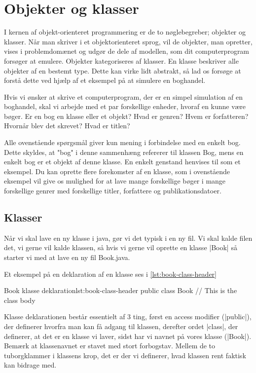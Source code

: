 \chapter{Objekter og klasser}

I kernen af objekt-orienteret programmering er de to nøglebegreber; objekter og klasser. Når man skriver i et objektorienteret sprog, vil de objekter, man opretter, vises i problemdomænet og udgør de dele af modellen, som dit computerprogram forsøger at emulere. Objekter kategoriseres af klasser. En klasse beskriver alle objekter af en bestemt type. Dette kan virke lidt abstrakt, så lad os forsøge at forstå dette ved hjælp af et eksempel på at simulere en boghandel.

\begin{example}
	Hvis vi ønsker at skrive et computerprogram, der er en simpel simulation af en boghandel, skal vi arbejde med et par forskellige enheder, hvoraf en kunne være bøger. Er en bog en klasse eller et objekt? Hvad er genren? Hvem er forfatteren? Hvornår blev det skrevet? Hvad er titlen?
	
	Alle ovenstående spørgsmål giver kun mening i forbindelse med en enkelt bog. Dette skyldes, at "bog" i denne sammenhæng refererer til klassen Bog, mens en enkelt bog er et objekt af denne klasse. En enkelt genstand henvises til som et eksempel. Du kan oprette flere forekomster af en klasse, som i ovenstående eksempel vil give os mulighed for at lave mange forskellige bøger i mange forskellige genrer med forskellige titler, forfattere og publikationsdatoer.
\end{example}

\section{Klasser}
Når vi skal lave en ny klasse i java, gør vi det typisk i en ny fil. Vi skal kalde filen det, vi gerne vil kalde klassen, så hvis vi gerne vil oprette en klasse \JavaInline|Book| så starter vi med at lave en ny fil Book.java.

Et eksempel på en deklaration af en klasse ses i \autoref{lst:book-class-header}

\begin{JavaCode}{Book klasse deklaration}{lst:book-class-header}
	public class Book {
		// This is the class body
	}
\end{JavaCode}

Klasse deklarationen består essentielt af 3 ting, først en access modifier (\JavaInline|public|), der definerer hvorfra man kan få adgang til klassen, derefter ordet \JavaInline|class|, der definerer, at det er en klasse vi laver, sidst har vi navnet på vores klasse (\JavaInline|Book|). Bemærk at klassenavnet er stavet med stort forbogstav. Mellem de to tuborgklammer i klassens krop, det er der vi definerer, hvad klassen rent faktisk kan bidrage med.


